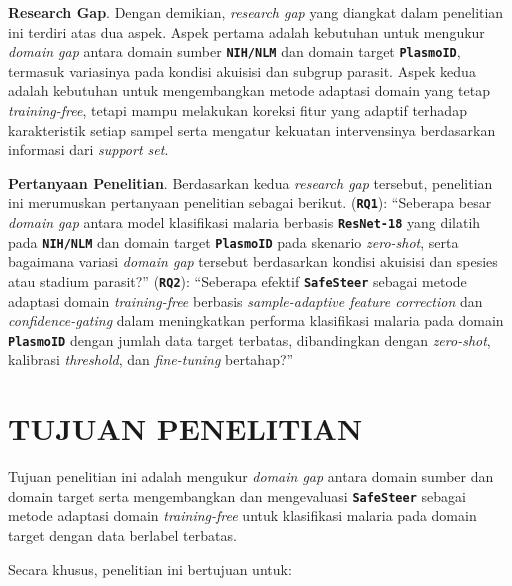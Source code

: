\documentclass[conference]{IEEEtran}
\newcommand{\nama}[1]{\textbf{\texttt{#1}}}
\newcommand{\myparagraph}[1]{\vspace{0.2cm}\noindent\textbf{#1}.}
\begin{document}
\myparagraph{Research Gap} Dengan demikian,  \textit{research gap} yang diangkat dalam penelitian ini terdiri atas dua aspek. Aspek pertama adalah kebutuhan untuk mengukur \textit{domain gap} antara domain sumber \nama{NIH/NLM} dan domain target \nama{PlasmoID}, termasuk variasinya pada kondisi akuisisi dan subgrup parasit. Aspek kedua adalah kebutuhan untuk mengembangkan metode adaptasi domain yang tetap \textit{training-free}, tetapi mampu melakukan koreksi fitur yang adaptif terhadap karakteristik setiap sampel serta mengatur kekuatan intervensinya berdasarkan informasi dari \textit{support set}.

\myparagraph{Pertanyaan Penelitian} Berdasarkan kedua \textit{research gap} tersebut, penelitian ini merumuskan pertanyaan penelitian sebagai berikut.
(\nama{RQ1}): ``Seberapa besar \textit{domain gap} antara model klasifikasi malaria berbasis \nama{ResNet-18} yang dilatih pada \nama{NIH/NLM} dan domain target \nama{PlasmoID} pada skenario \textit{zero-shot}, serta bagaimana variasi \textit{domain gap} tersebut berdasarkan kondisi akuisisi dan spesies atau stadium parasit?''
(\nama{RQ2}): ``Seberapa efektif \nama{SafeSteer} sebagai metode adaptasi domain \textit{training-free} berbasis \textit{sample-adaptive feature correction} dan \textit{confidence-gating} dalam meningkatkan performa klasifikasi malaria pada domain \nama{PlasmoID} dengan jumlah data target terbatas, dibandingkan dengan \textit{zero-shot}, kalibrasi \textit{threshold}, dan \textit{fine-tuning} bertahap?''

\section{TUJUAN PENELITIAN}
\label{tujuan}

Tujuan penelitian ini adalah mengukur \textit{domain gap} antara domain sumber dan domain target serta mengembangkan dan mengevaluasi \nama{SafeSteer} sebagai metode adaptasi domain \textit{training-free} untuk klasifikasi malaria pada domain target dengan data berlabel terbatas.

Secara khusus, penelitian ini bertujuan untuk:
\end{document}
